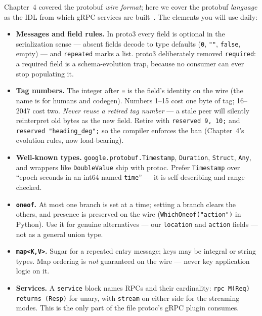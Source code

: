 Chapter~4 covered the protobuf \emph{wire format}; here we cover the protobuf
\emph{language} as the IDL from which gRPC services are
built~\cite{protobufdocs}. The elements you will use daily:

\begin{itemize}
  \item \textbf{Messages and field rules.} In proto3 every field is optional in
        the serialization sense --- absent fields decode to type defaults
        (\texttt{0}, \texttt{""}, \texttt{false}, empty) --- and
        \texttt{repeated} marks a list. proto3 deliberately removed
        \texttt{required}: a required field is a schema-evolution trap, because
        no consumer can ever stop populating it.
  \item \textbf{Tag numbers.} The integer after \texttt{=} is the field's
        identity on the wire (the name is for humans and codegen). Numbers
        1--15 cost one byte of tag; 16--2047 cost two. \emph{Never reuse a
        retired tag number} --- a stale peer will silently reinterpret old bytes
        as the new field. Retire with \texttt{reserved 9, 10;} and
        \texttt{reserved "heading\_deg";} so the compiler enforces the ban
        (Chapter~4's evolution rules, now load-bearing).
  \item \textbf{Well-known types.} \texttt{google.protobuf.Timestamp},
        \texttt{Duration}, \texttt{Struct}, \texttt{Any}, and wrappers like
        \texttt{DoubleValue} ship with protoc. Prefer \texttt{Timestamp} over
        ``epoch seconds in an int64 named \texttt{time}'' --- it is
        self-describing and range-checked.
  \item \textbf{\texttt{oneof}.} At most one branch is set at a time; setting a
        branch clears the others, and presence is preserved on the wire
        (\texttt{WhichOneof("action")} in Python). Use it for genuine
        alternatives --- our \texttt{location} and \texttt{action} fields ---
        not as a general union type.
  \item \textbf{\texttt{map<K,V>}.} Sugar for a repeated entry message; keys may
        be integral or string types. Map ordering is \emph{not} guaranteed on
        the wire --- never key application logic on it.
  \item \textbf{Services.} A \texttt{service} block names RPCs and their
        cardinality: \texttt{rpc M(Req) returns (Resp)} for unary, with
        \texttt{stream} on either side for the streaming modes. This is the
        only part of the file protoc's gRPC plugin consumes.
\end{itemize}

